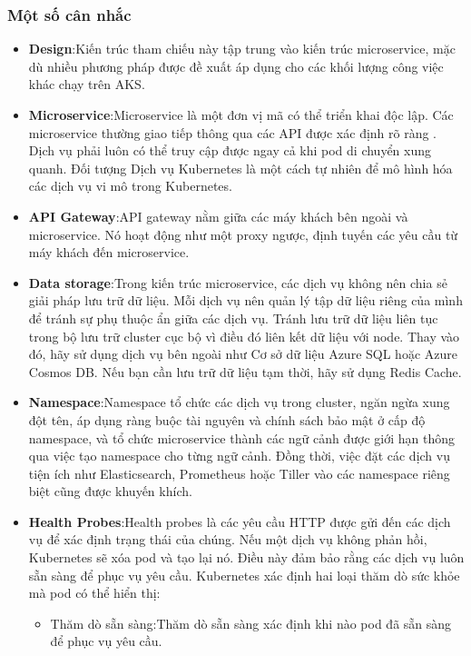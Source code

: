 \subsubsection{Một số cân nhắc}
\begin{itemize}
    \item \textbf{Design}:Kiến trúc tham chiếu này tập trung vào kiến trúc microservice, mặc dù nhiều phương pháp được đề xuất áp dụng cho các khối lượng công việc khác chạy trên AKS.
    \item \textbf{Microservice}:Microservice là một đơn vị mã có thể triển khai độc lập. Các microservice thường giao tiếp thông qua các API được xác định rõ ràng . Dịch vụ phải luôn có thể truy cập được ngay cả khi pod di chuyển xung quanh. Đối tượng Dịch vụ Kubernetes là một cách tự nhiên để mô hình hóa các dịch vụ vi mô trong Kubernetes.
    \item \textbf{API Gateway}:API gateway nằm giữa các máy khách bên ngoài và microservice. Nó hoạt động như một proxy ngược, định tuyến các yêu cầu từ máy khách đến microservice.
    \item \textbf{Data storage}:Trong kiến trúc microservice, các dịch vụ không nên chia sẻ giải pháp lưu trữ dữ liệu. Mỗi dịch vụ nên quản lý tập dữ liệu riêng của mình để tránh sự phụ thuộc ẩn giữa các dịch vụ.
Tránh lưu trữ dữ liệu liên tục trong bộ lưu trữ cluster cục bộ vì điều đó liên kết dữ liệu với node. Thay vào đó, hãy sử dụng dịch vụ bên ngoài như Cơ sở dữ liệu Azure SQL hoặc Azure Cosmos DB. Nếu bạn cần lưu trữ dữ liệu tạm thời, hãy sử dụng Redis Cache.
    \item \textbf{Namespace}:Namespace tổ chức các dịch vụ trong cluster, ngăn ngừa xung đột tên, áp dụng ràng buộc tài nguyên và chính sách bảo mật ở cấp độ namespace, và tổ chức microservice thành các ngữ cảnh được giới hạn thông qua việc tạo namespace cho từng ngữ cảnh. Đồng thời, việc đặt các dịch vụ tiện ích như Elasticsearch, Prometheus hoặc Tiller vào các namespace riêng biệt cũng được khuyến khích.
    \item \textbf{Health Probes}:Health probes là các yêu cầu HTTP được gửi đến các dịch vụ để xác định trạng thái của chúng. Nếu một dịch vụ không phản hồi, Kubernetes sẽ xóa pod và tạo lại nó. Điều này đảm bảo rằng các dịch vụ luôn sẵn sàng để phục vụ yêu cầu.
    \newline
    Kubernetes xác định hai loại thăm dò sức khỏe mà pod có thể hiển thị:
        \begin{itemize}
            \item Thăm dò sẵn sàng:Thăm dò sẵn sàng xác định khi nào pod đã sẵn sàng để phục vụ yêu cầu.  

\end{itemize}
\end{itemize}
